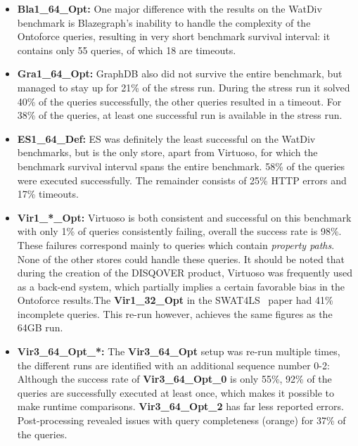 \begin{itemize}
	\item \textbf{Bla1\_64\_Opt:} One major difference with the results on the WatDiv benchmark is Blazegraph's inability to handle the complexity of the Ontoforce queries, resulting in very short benchmark survival interval: it contains only 55 queries, of which 18 are timeouts.
	
	\item \textbf{Gra1\_64\_Opt:} GraphDB also did not survive the entire benchmark, but managed to stay up for 21\% of the stress run. During the stress run it solved 40\% of the queries successfully, the other queries resulted in a timeout. For 38\% of the queries, at least one successful run is available in the stress run.

	\item \textbf{ES1\_64\_Def:} ES was definitely the least successful on the WatDiv benchmarks, but is the only store, apart from Virtuoso, for which the benchmark survival interval spans the entire benchmark. 58\% of the queries were executed successfully. The remainder consists of 25\% HTTP errors and 17\% timeouts. 
	\item \textbf{Vir1\_*\_Opt:} Virtuoso is both consistent and successful on this benchmark with only 1\% of queries consistently failing, overall the success rate is 98\%. These failures correspond mainly to queries which contain \emph{property paths}. None of the other stores could handle these queries. 
	It should be noted that during the creation of the DISQOVER product, Virtuoso was frequently used as a back-end system, which partially implies a certain favorable bias in the Ontoforce results.The \textbf{Vir1\_32\_Opt} in the SWAT4LS~\cite{dewitte_swat4ls_2016} paper had 41\% incomplete queries. This re-run however, achieves the same figures as the 64GB run.
	
	\item \textbf{Vir3\_64\_Opt\_*:} The  \textbf{Vir3\_64\_Opt} setup was re-run multiple times, the different runs are identified with an additional sequence number 0-2:
	Although the success rate of \textbf{Vir3\_64\_Opt\_0} is only 55\%, 92\% of the queries are successfully executed at least once, which makes it possible to make runtime comparisons. \textbf{Vir3\_64\_Opt\_2} has far less reported errors. Post-processing revealed issues with query completeness (orange) for 37\% of the queries.
\end{itemize}


